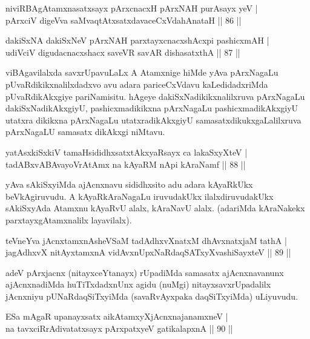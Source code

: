\begin{shl}
niviRBAgAtamxnasatxsayx pArxcnacxH pArxNAH purA\s sayx yeV |\\
pArxciV digeVva saMvaqtAtxsatxdavaceCxVdahAnataH \hfill || 86 || 
\end{shl}

\begin{shl}
dakiSxNA dakiSxNeV pArxNAH parxtayxcnacxshAcxpi pashicxmAH |\\
udiVciV digudacnacxshacx saveVR savAR dishasatxthA \hfill || 87 || 
\end{shl}

\begin{artha}
viBAgavilalxda savxrUpavuLaLx A Atamxnige hiMde yAva pArxNagaLu pUvaRdikikxnalilxdadxvo avu adara pariceCxVdavu kaLedidadxriMda pUvaRdikAkxgiye pariNamisitu. hAgeye dakiSxNadikikxnalilxruva pArxNagaLu dakiSxNadikAkxgiyU, pashicxmadikikxna pArxNagaLu pashicxmadikAkxgiyU utatxra dikikxna pArxNagaLu utatxradikAkxgiyU samasatxdikukxgaLalilxruva pArxNagaLU samasatx dikAkxgi niMtavu.
\end{artha}

\begin{shl}
yatAsxkiSxkiV tamaHsididhxsatxtAkxyaRsayx ca lakaSxyXteV |\\
tadABxvABAvayoVrAtAmx na kAyaRM nApi kAraNamf \hfill || 88 || 
\end{shl}

\begin{artha}
yAva sAkiSxyiMda ajAcnxnavu sididhxsito adu adara kAyaRkUkx beVkAgiruvudu. A kAyaRkAraNagaLu iruvudakUkx ilalxdiruvudakUkx sAkiSxyAda Atamxnu kAyaRvU alalx, kAraNavU alalx. (adariMda kAraNakekx parxtayxgAtamxnalilx layavilalx). 
\end{artha}

\begin{shl}
teVneYva jAcnxtamxnA\s sheVSaM tadAdhxvXnatxM dhAvxnatxjaM tathA |\\
jagAdhxvX nitAyxtamxnA vidAvxnUpxNaRdaqSATxyX\s vashiSayxteV \hfill || 89 || 
\end{shl}

\begin{artha}
adeV pArxjacnx (nitayxceYtanayx) rUpadiMda samasatx ajAcnxnavanunx ajAcnxnadiMda huTiTxdadxnUnx agidu (nuMgi) nitayxsavxrUpadalilx jAcnxniyu pUNaRdaqSiTxyiMda (savaRvAyxpaka daqSiTxyiMda) uLiyuvudu.
\end{artha}


\begin{shl}
ESa mAgaR upanayxsatx aikAtamxyXjAcnxnajanamxneV |\\
na tavxciRrAdivatatxsayx pArxpatxyeV gatikalapxnA \hfill || 90 || 
\end{shl}

